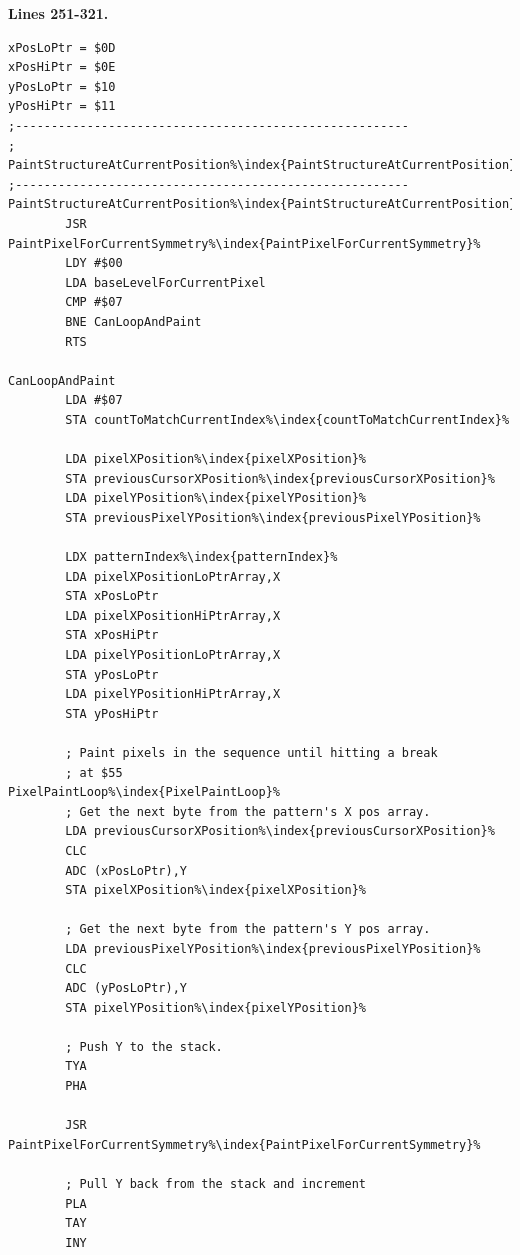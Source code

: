 \clearpage
\textbf{Lines 251-321. } 
\begin{lstlisting}[basicstyle=\ttfamily\scriptsize, caption=The routine responsible for painting patterns.,escapechar=\%]
xPosLoPtr = $0D
xPosHiPtr = $0E
yPosLoPtr = $10
yPosHiPtr = $11
;-------------------------------------------------------
; PaintStructureAtCurrentPosition%\index{PaintStructureAtCurrentPosition}%
;-------------------------------------------------------
PaintStructureAtCurrentPosition%\index{PaintStructureAtCurrentPosition}%   
        JSR PaintPixelForCurrentSymmetry%\index{PaintPixelForCurrentSymmetry}%
        LDY #$00
        LDA baseLevelForCurrentPixel
        CMP #$07
        BNE CanLoopAndPaint
        RTS 

CanLoopAndPaint   
        LDA #$07
        STA countToMatchCurrentIndex%\index{countToMatchCurrentIndex}%

        LDA pixelXPosition%\index{pixelXPosition}%
        STA previousCursorXPosition%\index{previousCursorXPosition}%
        LDA pixelYPosition%\index{pixelYPosition}%
        STA previousPixelYPosition%\index{previousPixelYPosition}%

        LDX patternIndex%\index{patternIndex}%
        LDA pixelXPositionLoPtrArray,X
        STA xPosLoPtr
        LDA pixelXPositionHiPtrArray,X
        STA xPosHiPtr
        LDA pixelYPositionLoPtrArray,X
        STA yPosLoPtr
        LDA pixelYPositionHiPtrArray,X
        STA yPosHiPtr

        ; Paint pixels in the sequence until hitting a break
        ; at $55
PixelPaintLoop%\index{PixelPaintLoop}%   
        ; Get the next byte from the pattern's X pos array.
        LDA previousCursorXPosition%\index{previousCursorXPosition}%
        CLC 
        ADC (xPosLoPtr),Y
        STA pixelXPosition%\index{pixelXPosition}%

        ; Get the next byte from the pattern's Y pos array.
        LDA previousPixelYPosition%\index{previousPixelYPosition}%
        CLC 
        ADC (yPosLoPtr),Y
        STA pixelYPosition%\index{pixelYPosition}%

        ; Push Y to the stack.
        TYA 
        PHA 

        JSR PaintPixelForCurrentSymmetry%\index{PaintPixelForCurrentSymmetry}%

        ; Pull Y back from the stack and increment
        PLA 
        TAY 
        INY 
\end{lstlisting}
\clearpage

